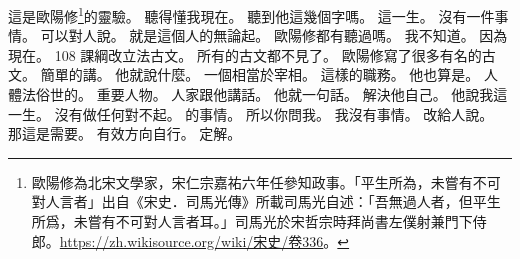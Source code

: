 \hypertarget{c01:cue:320}{}這是歐陽修\footnote{歐陽修為北宋文學家，宋仁宗嘉祐六年任參知政事。「平生所為，未嘗有不可對人言者」出自《宋史．司馬光傳》所載司馬光自述：「吾無過人者，但平生所爲，未嘗有不可對人言者耳。」司馬光於宋哲宗時拜尚書左僕射兼門下侍郎。\href{https://zh.wikisource.org/wiki/\%E5\%AE\%8B\%E5\%8F\%B2/\%E5\%8D\%B7336}{https://zh.wikisource.org/wiki/宋史/卷336}。}的靈驗。
\hypertarget{c01:cue:321}{}聽得懂我現在。
\hypertarget{c01:cue:322}{}聽到他這幾個字嗎。
\hypertarget{c01:cue:323}{}這一生。
\hypertarget{c01:cue:324}{}沒有一件事情。
\hypertarget{c01:cue:325}{}可以對人說。
\hypertarget{c01:cue:326}{}就是這個人的無論起。
\hypertarget{c01:cue:327}{}歐陽修都有聽過嗎。
\hypertarget{c01:cue:328}{}我不知道。
\hypertarget{c01:cue:329}{}因為現在。
\hypertarget{c01:cue:330}{}108 課綱改立法古文。
\hypertarget{c01:cue:331}{}所有的古文都不見了。
\hypertarget{c01:cue:332}{}歐陽修寫了很多有名的古文。
\hypertarget{c01:cue:333}{}簡單的講。
\hypertarget{c01:cue:334}{}他就說什麼。
\hypertarget{c01:cue:335}{}一個相當於宰相。
\hypertarget{c01:cue:336}{}這樣的職務。
\hypertarget{c01:cue:337}{}他也算是。
\hypertarget{c01:cue:338}{}人體法俗世的。
\hypertarget{c01:cue:339}{}重要人物。
\hypertarget{c01:cue:340}{}人家跟他講話。
\hypertarget{c01:cue:341}{}他就一句話。
\hypertarget{c01:cue:342}{}解決他自己。
\hypertarget{c01:cue:343}{}他說我這一生。
\hypertarget{c01:cue:344}{}沒有做任何對不起。
\hypertarget{c01:cue:345}{}的事情。
\hypertarget{c01:cue:346}{}所以你問我。
\hypertarget{c01:cue:347}{}我沒有事情。
\hypertarget{c01:cue:348}{}改給人說。
\hypertarget{c01:cue:349}{}那這是需要。
\hypertarget{c01:cue:350}{}有效方向自行。
\hypertarget{c01:cue:351}{}定解。

